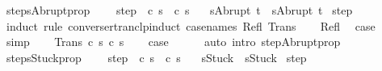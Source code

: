 \begin{isabellebody}
%
\isadelimproof
\isanewline
%
\endisadelimproof
\isanewline
{}\isamarkupfalse%
\ steps{\isacharunderscore}Abrupt{\isacharunderscore}prop{\isacharcolon}\ \isanewline
\ \ \ step{\isacharcolon}\ {\isachardoublequoteopen}{\isasymGamma}{\isasymturnstile}\ {\isacharparenleft}c{\isacharcomma}\ s{\isacharparenright}\ {\isasymrightarrow}\isactrlsup {\isacharasterisk}\ {\isacharparenleft}c{\isacharprime}{\isacharcomma}\ s{\isacharprime}{\isacharparenright}{\isachardoublequoteclose}\isanewline
\ \ \ {\isachardoublequoteopen}s{\isacharequal}Abrupt\ t\ {\isasymLongrightarrow}\ s{\isacharprime}{\isacharequal}Abrupt\ t{\isachardoublequoteclose}\isanewline
%
\isadelimproof
%
\endisadelimproof
%
\isatagproof
{}\isamarkupfalse%
\ step\isanewline
{}\isamarkupfalse%
\ {\isacharparenleft}induct\ rule{\isacharcolon}\ converse{\isacharunderscore}rtranclp{\isacharunderscore}induct{}\ {\isacharbrackleft}case{\isacharunderscore}names\ Refl\ Trans{\isacharbrackright}{\isacharparenright}\isanewline
\ \ \isamarkupfalse%
\ Refl\ \isamarkupfalse%
\ {\isacharquery}case\ \isamarkupfalse%
\ simp\isanewline
{}\isamarkupfalse%
\isanewline
\ \ \isamarkupfalse%
\ {\isacharparenleft}Trans\ c\ s\ c{\isacharprime}{\isacharprime}\ s{\isacharprime}{\isacharprime}{\isacharparenright}\isanewline
\ \ \isamarkupfalse%
\ {\isacharquery}case\isanewline
\ \ \ \ \isamarkupfalse%
\ {\isacharparenleft}auto\ intro{\isacharcolon}\ step{\isacharunderscore}Abrupt{\isacharunderscore}prop{\isacharparenright}\isanewline
{}\isamarkupfalse%
%
\endisatagproof
{\isafoldproof}%
%
\isadelimproof
\isanewline
%
\endisadelimproof
\isanewline
{}\isamarkupfalse%
\ steps{\isacharunderscore}Stuck{\isacharunderscore}prop{\isacharcolon}\ \isanewline
\ \ \ step{\isacharcolon}\ {\isachardoublequoteopen}{\isasymGamma}{\isasymturnstile}\ {\isacharparenleft}c{\isacharcomma}\ s{\isacharparenright}\ {\isasymrightarrow}\isactrlsup {\isacharasterisk}\ {\isacharparenleft}c{\isacharprime}{\isacharcomma}\ s{\isacharprime}{\isacharparenright}{\isachardoublequoteclose}\isanewline
\ \ \ {\isachardoublequoteopen}s{\isacharequal}Stuck\ {\isasymLongrightarrow}\ s{\isacharprime}{\isacharequal}Stuck{\isachardoublequoteclose}\isanewline
%
\isadelimproof
%
\endisadelimproof
%
\isatagproof
{}\isamarkupfalse%
\ step\isanewline
{}\isamarkupfalse%

\end{isabellebody}
